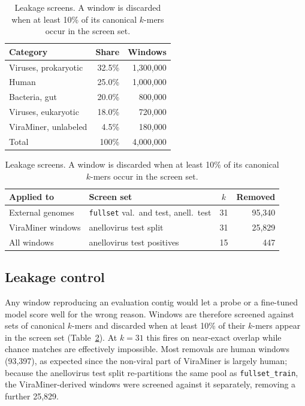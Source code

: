 \documentclass[10pt,twocolumn,a4paper]{article}
\begin{document}
\begin{table}[t]
\centering
\begin{minipage}[t]{0.45\textwidth}
\centering
\caption{Composition of \texttt{corpus\_v3}.}
\label{tab:mix}
\small
\begin{tabular}{lrr}
\toprule
Category & Share & Windows \\
\midrule
Viruses, prokaryotic & 32.5\% & 1{,}300{,}000 \\
Human                & 25.0\% & 1{,}000{,}000 \\
Bacteria, gut        & 20.0\% &   800{,}000 \\
Viruses, eukaryotic  & 18.0\% &   720{,}000 \\
ViraMiner, unlabeled &  4.5\% &   180{,}000 \\
\midrule
Total                & 100\%  & 4{,}000{,}000 \\
\bottomrule
\end{tabular}
\end{minipage}\hfill
\begin{minipage}[t]{0.52\textwidth}
\centering
\caption{Leakage screens. A window is discarded when at least 10\% of its
canonical $k$-mers occur in the screen set.}
\label{tab:screen}
\small
\begin{tabular}{p{2.2cm}p{2.5cm}cr}
\toprule
Applied to & Screen set & $k$ & Removed \\
\midrule
External genomes & \texttt{fullset} val.\ and test, anell.\ test & 31 & 95{,}340 \\
ViraMiner windows & anellovirus test split & 31 & 25{,}829 \\
All windows & anellovirus test positives & 15 & 447 \\
\bottomrule
\end{tabular}
\end{minipage}
\end{table}

\subsection{Leakage control}

Any window reproducing an evaluation contig would let a probe or a fine-tuned
model score well for the wrong reason. Windows are therefore screened against
sets of canonical $k$-mers and discarded when at least 10\% of their $k$-mers
appear in the screen set (Table~\ref{tab:screen}). At $k=31$ this fires on
near-exact overlap while chance matches are effectively impossible. Most removals
are human windows (93{,}397), as expected since the non-viral part of ViraMiner
is largely human; because the anellovirus test split re-partitions the same pool
as \texttt{fullset\_train}, the ViraMiner-derived windows were screened against
it separately, removing a further 25{,}829.
\end{document}
